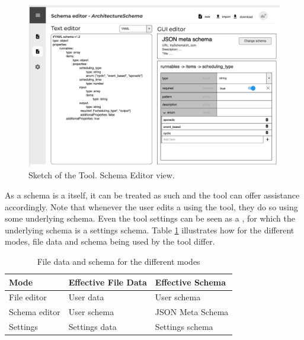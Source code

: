 \begin{figure}[!t]
    \includegraphics[width=\textwidth]{figures/mockup_gui_schema}
    \caption{Sketch of the Tool. Schema Editor view.}
    \label{mockup_gui_schema}
\end{figure}

As a schema is a \cfgfile{} itself, it can be treated as such and the tool can offer assistance accordingly.
Note that whenever the user edits a \cfgfile{} using the tool, they do so using some underlying schema.
Even the tool settings can be seen as a \cfgfile{}, for which the underlying schema is a settings schema.
Table \ref{tab:schema_and_file_data_by_mode} illustrates how for the different modes, file data and schema being used by the tool differ.
\begin{table}[!t]
\caption{File data and schema for the different modes}
\label{tab:schema_and_file_data_by_mode}
\centering
\begin{tabular}{lll}
\toprule
\textbf{Mode} & \textbf{Effective File Data} & \textbf{Effective Schema} \\ 
\midrule
File editor   & User data                    & User schema               \\
Schema editor & User schema                  & JSON Meta Schema          \\
Settings      & Settings data                & Settings schema           \\
\bottomrule
\end{tabular}
\end{table}




